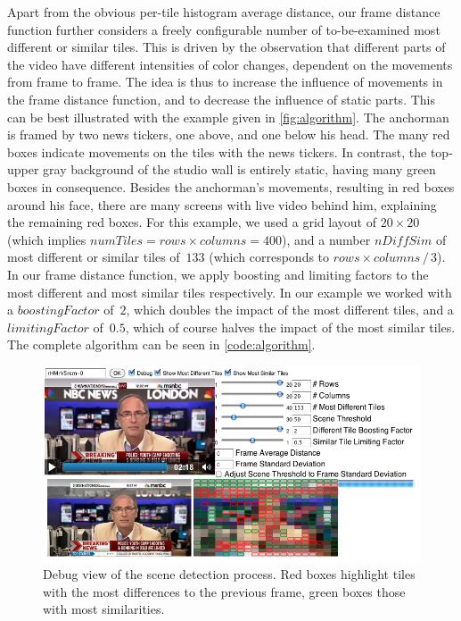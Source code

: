 \documentclass[10pt,twocolumn,letterpaper]{article}
\begin{document}
Apart from the obvious per-tile histogram average distance, our frame distance function further considers a freely configurable number of to-be-examined most different or similar tiles. This is driven by the observation that different parts of the video have different intensities of color changes, dependent on the movements from frame to frame. The idea is thus to increase the influence of movements in the frame distance function, and to decrease the influence of static parts. This can be best illustrated with the example given in \autoref{fig:algorithm}. The anchorman is framed by two news tickers, one above, and one below his head. The many red boxes indicate movements on the tiles with the news tickers.
In contrast, the top-upper gray background of the studio wall is entirely static, having many green boxes in consequence. Besides the anchorman's movements, resulting in red boxes around his face, there are many screens with live video behind him, explaining the remaining red boxes. For this example, we used a grid layout of $20 \times 20$ (which implies $\mathit{numTiles} = \mathit{rows} \times \mathit{columns} = 400$), and a number $\mathit{nDiffSim}$ of most different or similar tiles of~$133$ (which corresponds to $\mathit{rows} \times {columns}\,/\,3$). In our frame distance function, we apply boosting and limiting factors to the most different and most similar tiles respectively. In our example we worked with a $\mathit{boostingFactor}$ of~$2$, which doubles the impact of the most different tiles, and a $\mathit{limitingFactor}$ of~$0.5$, which of course halves the impact of the most similar tiles. The complete algorithm can be seen in \autoref{code:algorithm}.

\begin{figure}
\begin{center}
   \includegraphics[width=1.0\linewidth]{./resources/algorithm.png}
\end{center}
   \caption{Debug view of the scene detection process. Red boxes highlight tiles with the most differences to the previous frame, green boxes those with most similarities.}
\label{fig:algorithm}
\end{figure}
\end{document}
